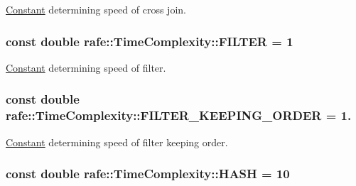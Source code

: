 \hyperlink{classrafe_1_1_constant}{Constant} determining speed of cross join. \hypertarget{classrafe_1_1_time_complexity_aa0625dabba1b84acbfd3bccb292e4ff6}{
\subsubsection[{F\+I\+L\+T\+E\+R}]{\setlength{\rightskip}{0pt plus 5cm}const double rafe\+::\+Time\+Complexity\+::\+F\+I\+L\+T\+E\+R = 1\hspace{0.3cm}{\ttfamily [static]}}}\label{classrafe_1_1_time_complexity_aa0625dabba1b84acbfd3bccb292e4ff6}
\hyperlink{classrafe_1_1_constant}{Constant} determining speed of filter. \hypertarget{classrafe_1_1_time_complexity_a0e8e454747c5a1bacc5f0d0753c54819}{
\subsubsection[{F\+I\+L\+T\+E\+R\+\_\+\+K\+E\+E\+P\+I\+N\+G\+\_\+\+O\+R\+D\+E\+R}]{\setlength{\rightskip}{0pt plus 5cm}const double rafe\+::\+Time\+Complexity\+::\+F\+I\+L\+T\+E\+R\+\_\+\+K\+E\+E\+P\+I\+N\+G\+\_\+\+O\+R\+D\+E\+R = 1.\hspace{0.3cm}{\ttfamily [static]}}}\label{classrafe_1_1_time_complexity_a0e8e454747c5a1bacc5f0d0753c54819}
\hyperlink{classrafe_1_1_constant}{Constant} determining speed of filter keeping order. \hypertarget{classrafe_1_1_time_complexity_acc03b3c0cae3944fbb8d93db0c668eea}{
\subsubsection[{H\+A\+S\+H}]{\setlength{\rightskip}{0pt plus 5cm}const double rafe\+::\+Time\+Complexity\+::\+H\+A\+S\+H = 10\hspace{0.3cm}{\ttfamily [static]}}}\label{classrafe_1_1_time_complexity_acc03b3c0cae3944fbb8d93db0c668eea}

